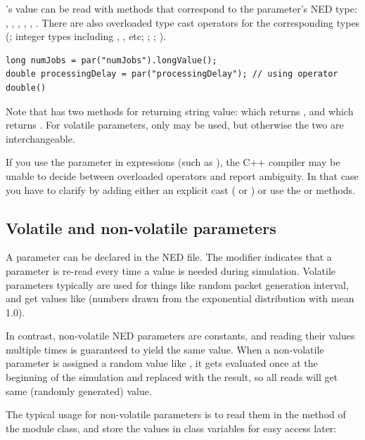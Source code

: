 's value can be read with methods that correspond to
the parameter's NED type: , ,
, , ,
.
There are also overloaded type cast operators for the corresponding types
(; integer types including , , etc;
; ; ).

\begin{verbatim}
long numJobs = par("numJobs").longValue();
double processingDelay = par("processingDelay"); // using operator double()
\end{verbatim}

Note that  has two methods for returning string value:
 which returns , and
 which returns .
For volatile parameters, only  may be used,
but otherwise the two are interchangeable.

If you use the  parameter in expressions (such as
), the C++ compiler may be unable to decide
between overloaded operators and report ambiguity. In that case
you have to clarify by adding either an explicit cast
( or ) or use
the  or  methods.


\subsection{Volatile and non-volatile parameters}
\label{sec:simple-modules:volatile-parameters}

A parameter can be declared  in the NED file. The 
modifier indicates that a parameter is re-read every time a value is needed
during simulation. Volatile parameters typically are used for things like
random packet generation interval, and get values like 
(numbers drawn from the exponential distribution with mean 1.0).

In contrast, non-volatile NED parameters are constants, and reading their
values multiple times is guaranteed to yield the same value. When a non-volatile
parameter is assigned a random value like , it gets
evaluated once at the beginning of the simulation and replaced with the result,
so all reads will get same (randomly generated) value.

The typical usage for non-volatile parameters is to read them in the
 method of the module class, and store the values
in class variables for easy access later:

